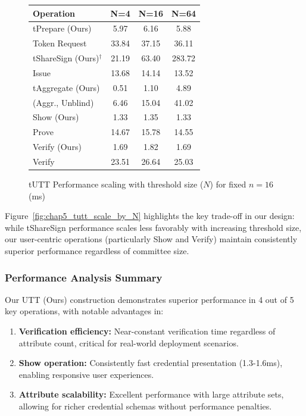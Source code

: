 \begin{figure}[!htb]
\begin{minipage}[t]{0.48\textwidth}
        \vspace{0.5em}
        \scriptsize
        \begin{tabular}{lccc}
        \toprule
        \textbf{Operation} & \textbf{N=4} & \textbf{N=16} & \textbf{N=64} \\
        \midrule
        tPrepare (Ours) & 5.97 & 6.16 & 5.88 \\
        Token Request & 33.84 & 37.15 & 36.11 \\
        \midrule
        tShareSign (Ours)$^{\dagger}$ & 21.19 & 63.40 & 283.72 \\
        Issue & 13.68 & 14.14 & 13.52 \\
        \midrule
        tAggregate (Ours) & 0.51 & 1.10 & 4.89 \\
        (Aggr., Unblind) & 6.46 & 15.04 & 41.02 \\
        \midrule
        Show (Ours) & 1.33 & 1.35 & 1.33 \\
        Prove & 14.67 & 15.78 & 14.55 \\
        \midrule
        Verify (Ours) & 1.69 & 1.82 & 1.69 \\
        Verify & 23.51 & 26.64 & 25.03 \\
        \bottomrule
        \end{tabular}
        \caption{tUTT Performance scaling with threshold size ($N$) for fixed $n=16$ (ms)}
        \label{tab:N_scaling_combined_utt_act}
    \end{minipage}
    
    \vspace{-0.5em}
    \scriptsize
\end{figure}


Figure~\ref{fig:chap5_tutt_scale_by_N} highlights the key trade-off in our design: while tShareSign performance scales less favorably with increasing threshold size, our user-centric operations (particularly Show and Verify) maintain consistently superior performance regardless of committee size.


\subsubsection{Performance Analysis Summary}
Our UTT (Ours) construction demonstrates superior performance in 4 out of 5 key operations, with notable advantages in:

\begin{enumerate}
    \item \textbf{Verification efficiency:} Near-constant verification time regardless of attribute count, critical for real-world deployment scenarios.

    \item \textbf{Show operation:} Consistently fast credential presentation (1.3-1.6ms), enabling responsive user experiences.

    \item \textbf{Attribute scalability:} Excellent performance with large attribute sets, allowing for richer credential schemas without performance penalties.
\end{enumerate}

